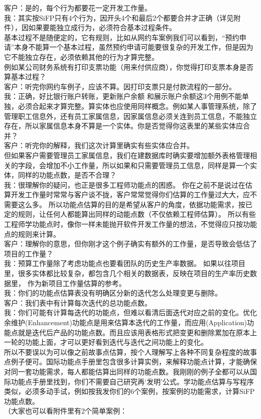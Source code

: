 \documentclass{book}        %
\begin{document}
客户：是的，每个行为都要花一定开发工作量。\\
我：其实按SiFP只有4个行为，因开头4个和最后2个都要合并才正确（详见附件），因如果要能独立成行为，必须符合基本过程条件。\\
基本过程不是随便定的，它有规则，比如从网约车案例我们可以看到，``预约申请''本身不能算一个基本过程，虽然预约申请可能要很复杂的开发工作，但是因为它不能独立存在，必须依赖其他的行为才算完整。\\
例如某公司财务系统有打印支票功能（用来付供应商），你觉得打印支票本身是否算基本过程？\\
客户：听完你网约车例子，应该不算。因打印支票只是付款流程的一部分。\\
我：正确，好比银行账户转账，更新账户余额
和展示账户余额这3个用例不能单独，必须合起来才算完整。算实体也应使用同样概念。例如某人事管理系统，除了管理职工信息外，还有员工家属信息，因家属信息必须关连到员工信息，不能独立存在，所以家属信息本身不算是一个实体。你是否觉得你这表里的某些实体应合并？\\
客户：听完你的解释，我们这次计算里确实有些实体应合并。\\
但如果客户需要管理员工家属信息，我们在建数据库时确实要增加额外表格管理相关的字段，会增加不小工作量，所以如果和只需要管理员工信息，同样是算一个实体，同样的功能点数，是否不合理？\\
我：很理解你的疑问，也正是很多工程师功能点的困惑。
你在之前不是说过在估算开发工作量时常常与客户谈不拢，客户常常觉得你们估算的工作量过大大，应不需要这么多。
所以功能点估算的目的是希望从客户的角度，依据功能需求，按已定的规则，让任何人都能算出同样的动能点数（不仅依赖工程师估算）。
所以有些工程师学功能点时，像你一样未能抛开软件开发工作量的想法，不觉得应只按功能点的规则来计算。\\
客户：理解你的意思，但你刚才这个例子确实有额外的工作量，是否导致会低估了项目的工作量？\\
我：预算工作量除了考虑功能点也要看团队的历史生产率数据。
如果以往项目里，很多实体都比较复杂，都包含几个相关的数据表，反映在项目的生产率历史数据里，
作为新项目工作量估算的参考。\\
我：你们的功能点估算表没有明确区分新的迭代怎么处理变更与删除。\\
客户：我们表中有计算每次迭代的总功能点数。\\
我：你们可能有计算每迭代的功能点，但难以看清后面迭代对应之前的变化。优化余维护(Enhancement)功能点是用来估算本迭代的工作量，而应用(Application)功能点就是迭代后产品的功能点数。而且应该用表格形式把变更和删除累加在原本上一轮的功能上面，才可以更好看到迭代与迭代之间功能上的变化。\\
所以不要误以为可以像之前故事点估算，按个人理解写上各种不同复杂程度的故事点例子便可。国际功能点手册里包含很多计算实例，来解释功能点计算，才能确保对同一套功能需求，每人都能估算出同样的功能点数。我刚刚的例子全都可以从国际功能点手册里找到，你们不需要自己研究再`发明'公式。学功能点估算与写程序类似，必须多动手试，例如按我发你们的6个案例，按案例的功能需求，计算SiFP功能点数。\\
（大家也可以看附件里有2个简单案例：
\end{document}
